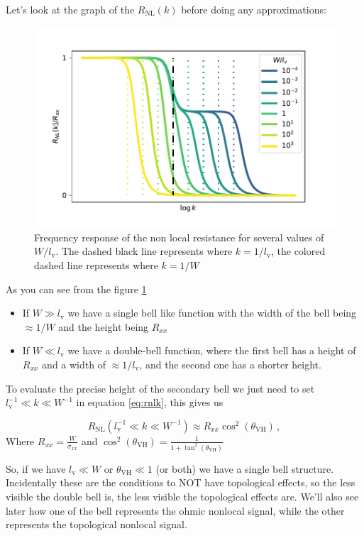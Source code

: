 Let's look at the graph of the $R_{\textrm{NL}}(k)$ before doing any approximations:
\begin{figure}[h!]
    \centering
    \includegraphics[width=\linewidth]{Immagini/rnl/widths.pdf}
    \caption{Frequency response of the non local resistance for several values of $W/l_\textrm{v}$. The dashed black line represents where $k=1/l_\textrm{v}$, the colored dashed line represents where $k=1/W$}
    \label{fig:RNLk}
\end{figure}
As you can see from the figure \ref{fig:RNLk} 
\begin{itemize}
    \item If $W\gg l_\textrm{v}$ we have a single bell like function with the width of the bell being $\approx 1/W$ and the height being $R_{xx}$ 
    \item If $W\ll l_\textrm{v}$ we have a double-bell function, where the first bell has a height of $R_{xx}$ and a width of $\approx 1/l_\textrm{v}$, and the second one has a shorter height.
\end{itemize}    
To evaluate the precise height of the secondary bell we just need to set $l_\textrm{v}^{-1}\ll k \ll W^{-1}$ in equation \ref{eq:rnlk}, this gives us

\begin{equation}
    R_{\textrm{NL}}(l_\textrm{v}^{-1}\ll k \ll W^{-1})\approx R_{xx}\cos^2(\theta_{\textrm{VH}})\,, 
    \label{eq:plateau} 
\end{equation}
Where $R_{xx}=\frac{W}{\sigma_{xx}}$ and $\cos^2(\theta_{\textrm{VH}})=\frac{1}{1+\tan^2(\theta_{\textrm{VH}})}$

So, if we have $l_\textrm{v}\ll W$ or $\theta_{\textrm{VH}}\ll 1$ (or both) we have a single bell structure. Incidentally these are the conditions to NOT have topological effects, so the less visible the double bell is, the less visible the topological effects are. We'll also see later how one of the bell represents the ohmic nonlocal signal, while the other represents the topological nonlocal signal. 

